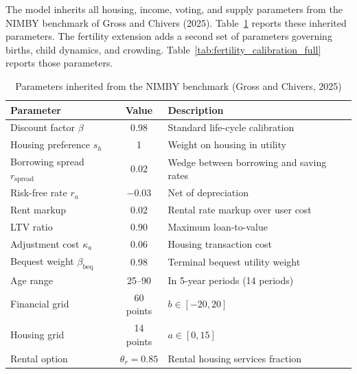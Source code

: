 The model inherits all housing, income, voting, and supply parameters from the NIMBY benchmark of Gross and Chivers (2025). Table~\ref{tab:nimby_params} reports these inherited parameters. The fertility extension adds a second set of parameters governing births, child dynamics, and crowding. Table~\ref{tab:fertility_calibration_full} reports those parameters.

\begin{table}[htbp]
\centering
\caption{Parameters inherited from the NIMBY benchmark (Gross and Chivers, 2025)}
\label{tab:nimby_params}
\small
\begin{tabular}{lcp{}}
\toprule
Parameter & Value & Description \\
\midrule
Discount factor $\beta$ & 0.98 & Standard life-cycle calibration \\
Housing preference $s_h$ & 1 & Weight on housing in utility \\
Borrowing spread $r_{\text{spread}}$ & 0.02 & Wedge between borrowing and saving rates \\
Risk-free rate $r_a$ & $-0.03$ & Net of depreciation \\
Rent markup & 0.02 & Rental rate markup over user cost \\
LTV ratio & 0.90 & Maximum loan-to-value \\
Adjustment cost $\kappa_a$ & 0.06 & Housing transaction cost \\
Bequest weight $\beta_{\text{beq}}$ & 0.98 & Terminal bequest utility weight \\
Age range & 25--90 & In 5-year periods (14 periods) \\
Financial grid & 60 points & $b \in [-20, 20]$ \\
Housing grid & 14 points & $a \in [0, 15]$ \\
Rental option & $\theta_r = 0.85$ & Rental housing services fraction \\
\bottomrule
\end{tabular}
\end{table}

